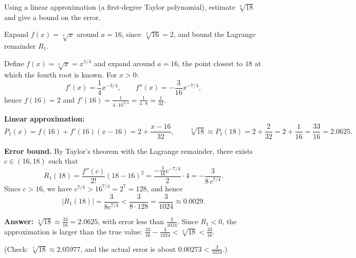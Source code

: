 
\begin{question}
Using a linear approximation (a first-degree Taylor polynomial), estimate $\sqrt[4]{18}$ and give a bound on the error.
\end{question}

\begin{hint}
Expand $f(x) = \sqrt[4]{x}$ around $a = 16$, since $\sqrt[4]{16} = 2$, and bound the Lagrange remainder $R_1$.
\end{hint}

\begin{solution}
Define $f(x) = \sqrt[4]{x} = x^{1/4}$ and expand around $a = 16$, the point closest to $18$ at which the fourth root is known. For $x > 0$:
\[ f'(x) = \frac14 x^{-3/4}, \qquad f''(x) = -\frac{3}{16} x^{-7/4}, \]
hence $f(16) = 2$ and $f'(16) = \frac{1}{4\cdot 16^{3/4}} = \frac{1}{4\cdot 8} = \frac{1}{32}$.

\textbf{Linear approximation:}
\[ P_1(x) = f(16) + f'(16)(x - 16) = 2 + \frac{x - 16}{32}, \qquad
   \sqrt[4]{18} \approx P_1(18) = 2 + \frac{2}{32} = 2 + \frac{1}{16} = \frac{33}{16} = 2.0625. \]

\textbf{Error bound.} By Taylor's theorem with the Lagrange remainder, there exists $c \in (16, 18)$ such that
\[ R_1(18) = \frac{f''(c)}{2!}(18 - 16)^2 = \frac{-\frac{3}{16}c^{-7/4}}{2}\cdot 4 = -\frac{3}{8\,c^{7/4}}. \]
Since $c > 16$, we have $c^{7/4} > 16^{7/4} = 2^7 = 128$, and hence
\[ |R_1(18)| = \frac{3}{8c^{7/4}} < \frac{3}{8\cdot128} = \frac{3}{1024} \approx 0.0029. \]

\textbf{Answer:} $\sqrt[4]{18} \approx \frac{33}{16} = 2.0625$, with error less than $\frac{3}{1024}$. Since $R_1 < 0$, the approximation is larger than the true value: $\frac{33}{16} - \frac{3}{1024} < \sqrt[4]{18} < \frac{33}{16}$.

(Check: $\sqrt[4]{18} \approx 2.05977$, and the actual error is about $0.00273 < \frac{3}{1024}$.)
\end{solution}
